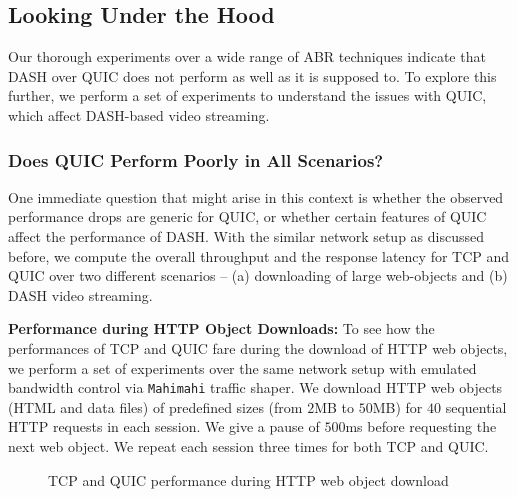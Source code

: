 \subsection{Looking Under the Hood}
Our thorough experiments over a wide range of ABR techniques indicate that DASH over QUIC does not perform as well as it is supposed to. To explore this further, we perform a set of experiments to understand the issues with QUIC, which affect DASH-based video streaming.

\subsubsection{Does QUIC Perform Poorly in All Scenarios?}
One immediate question that might arise in this context is whether the observed performance drops are generic for QUIC, or whether certain features of QUIC affect the performance of DASH. With the similar network setup as discussed before, we compute the overall throughput and the response latency for TCP and QUIC over two different scenarios -- (a) downloading of large web-objects and (b) DASH video streaming.

\newcommand{\subsubsubsection}[1]{\textbf{#1: }}
\subsubsubsection{Performance during HTTP Object Downloads}
To see how the performances of TCP and QUIC fare during the download of HTTP web objects, we perform a set of experiments over the same network setup with emulated bandwidth control via {\tt Mahimahi} traffic shaper. We download HTTP web objects (HTML and data files) of predefined sizes (from $2$MB to $50$MB) for $40$ sequential HTTP requests in each session. We give a pause of $500$ms before requesting the next web object. We repeat each session three times for both TCP and QUIC. 


\begin{figure}[!ht]
	\captionsetup[subfigure]{}
	\begin{center}
	\end{center}
	\caption{\label{fig:chap03s2:proofLargeFile}TCP and QUIC performance during HTTP web object download}
\end{figure}


